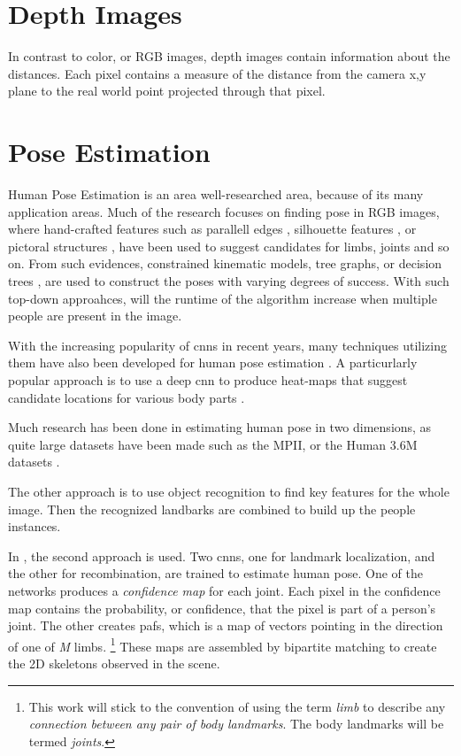 \section{Depth Images}
In contrast to color, or RGB images, depth images contain information about the distances. Each pixel contains a measure of the distance from the camera x,y plane to the real world point projected through that pixel. 





\section{Pose Estimation}
Human Pose Estimation is an area well-researched area, because of its many application areas. Much of the research focuses on finding pose in RGB images, where hand-crafted features such as parallell edges \cite{ramanan2003,mori2002}, silhouette features \cite{grauman2003}, or pictoral structures \cite{fischler1973,felzenszwalb2005}, have been used to suggest candidates for limbs, joints and so on. From such evidences, constrained kinematic models, tree graphs, or decision trees \cite{shotton2013}, are used to construct the poses with varying degrees of success. With such top-down approahces, will the runtime of the algorithm increase when multiple people are present in the image.

With the increasing popularity of \gls{cnn}s in recent years, many techniques utilizing them have also been developed for human pose estimation \cite{tompson2014joint}. A particurlarly popular approach is to use a deep \gls{cnn} to produce heat-maps that suggest candidate locations for various body parts \cite{wei2016cpm,wang2016}.

Much research has been done in estimating human pose in two dimensions, as quite large datasets have been made such as the MPII, or the Human 3.6M datasets \cite{andriluka14cvpr,h36m_pami}.


The other approach is to use object recognition to find key features for the whole image. Then the recognized landbarks are combined to build up the people instances.

In \cite{cao2017realtime}, the second approach is used. Two \gls{cnn}s, one for landmark localization, and the other for recombination, are trained to estimate human pose. One of the networks produces a \emph{confidence map} for each joint. Each pixel in the confidence map contains the probability, or confidence, that the pixel is part of a person's joint. The other creates \gls{paf}s, which is a map of vectors pointing in the direction of one of \emph{M} limbs. \footnote{This work will stick to the convention of using the term \emph{limb} to describe any \emph{connection between any pair of body landmarks}. The body landmarks will be termed \emph{joints}.} These maps are assembled by bipartite matching to create the 2D skeletons observed in the scene.

